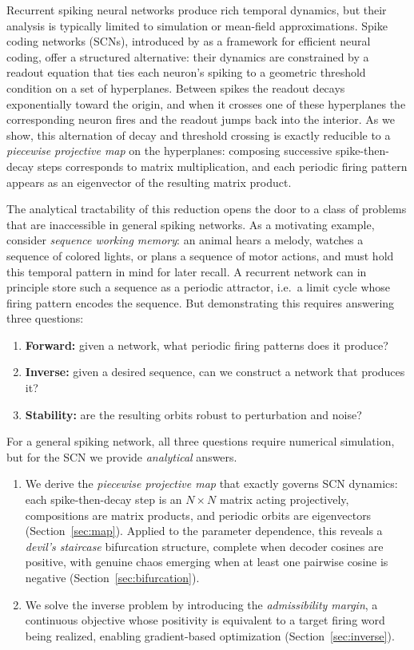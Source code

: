\documentclass[12pt]{article}
\begin{document}
Recurrent spiking neural networks produce rich temporal dynamics, but their analysis is typically limited to simulation or mean-field approximations. Spike coding networks (SCNs), introduced by \citet{boerlin2013predictive} as a framework for efficient neural coding, offer a structured alternative: their dynamics are constrained by a readout equation that ties each neuron's spiking to a geometric threshold condition on a set of hyperplanes. Between spikes the readout decays exponentially toward the origin, and when it crosses one of these hyperplanes the corresponding neuron fires and the readout jumps back into the interior. As we show, this alternation of decay and threshold crossing is exactly reducible to a \emph{piecewise projective map} on the hyperplanes: composing successive spike-then-decay steps corresponds to matrix multiplication, and each periodic firing pattern appears as an eigenvector of the resulting matrix product.

The analytical tractability of this reduction opens the door to a class of problems that are inaccessible in general spiking networks. As a motivating example, consider \emph{sequence working memory}: an animal hears a melody, watches a sequence of colored lights, or plans a sequence of motor actions, and must hold this temporal pattern in mind for later recall. A recurrent network can in principle store such a sequence as a periodic attractor, i.e.\ a limit cycle whose firing pattern encodes the sequence. But demonstrating this requires answering three questions:
\begin{enumerate}[nosep]
    \item \textbf{Forward:} given a network, what periodic firing patterns does it produce?
    \item \textbf{Inverse:} given a desired sequence, can we construct a network that produces it?
    \item \textbf{Stability:} are the resulting orbits robust to perturbation and noise?
\end{enumerate}
For a general spiking network, all three questions require numerical simulation, but for the SCN we provide \emph{analytical} answers.


\begin{enumerate}[nosep]
    \item We derive the \emph{piecewise projective map} that exactly governs SCN dynamics: each spike-then-decay step is an $N\times N$ matrix acting projectively, compositions are matrix products, and periodic orbits are eigenvectors (Section~\ref{sec:map}). Applied to the parameter dependence, this reveals a \emph{devil's staircase} bifurcation structure, complete when decoder cosines are positive, with genuine chaos emerging when at least one pairwise cosine is negative (Section~\ref{sec:bifurcation}).
    \item We solve the inverse problem by introducing the \emph{admissibility margin}, a continuous objective whose positivity is equivalent to a target firing word being realized, enabling gradient-based optimization (Section~\ref{sec:inverse}).
\end{enumerate}
\end{document}
